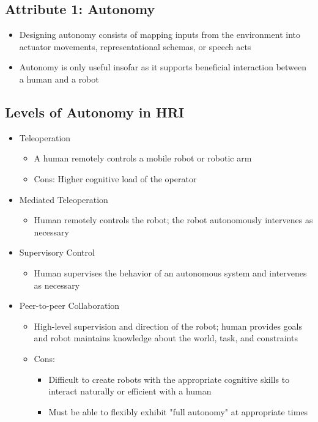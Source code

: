 \documentclass[10pt]{article}
\begin{document}
\subsection*{Attribute 1: Autonomy}
\begin{itemize}
	\item Designing autonomy consists of mapping inputs from the environment into actuator movements, representational schemas, or speech acts
    \item Autonomy is only useful insofar as it supports beneficial interaction between a human and a robot
\end{itemize}

\subsection*{Levels of Autonomy in HRI}
\begin{itemize}
	\item Teleoperation
	\begin{itemize}
        \item A human remotely controls a mobile robot or robotic arm
        \item Cons: Higher cognitive load of the operator
    \end{itemize}
	\item Mediated Teleoperation
	\begin{itemize}
        \item Human remotely controls the robot; the robot autonomously intervenes as necessary
    \end{itemize}
	\item Supervisory Control
	\begin{itemize}
        \item Human supervises the behavior of an autonomous system and intervenes as necessary
    \end{itemize}
	\item Peer-to-peer Collaboration
	\begin{itemize}
        \item High-level supervision and direction of the robot; human provides goals and robot maintains knowledge about the world, task, and constraints
        \item Cons:
        \begin{itemize}
            \item Difficult to create robots with the appropriate cognitive skills to interact naturally or efficient with a human
            \item Must be able to flexibly exhibit "full autonomy" at appropriate times
        \end{itemize}
    \end{itemize}
\end{itemize}
\end{document}
